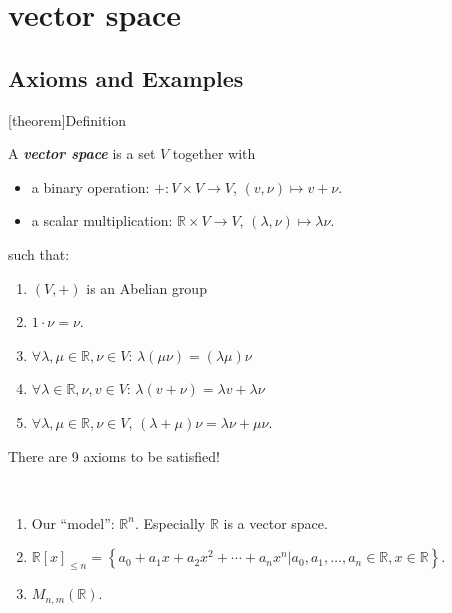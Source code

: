 \documentclass[12pt]{report}
\theoremstyle{definition}
\begin{document}
\section{vector space}

\subsection{Axioms and Examples}

[theorem]{Definition}
\begin{vector space}
    A \textbf{\emph{vector space}} is a set $V$ together with
                \begin{itemize}
                        \item a binary operation: $+:V\times V \rightarrow{} V$,
                            $(v, \nu) \mapsto v + \nu$.
                        \item a scalar multiplication: $\mathbb{R}\times V \rightarrow{} V$,
                            $(\lambda, \nu) \mapsto \lambda \nu$.
                \end{itemize}
              such that:
              \begin{enumerate}[label = (\arabic*)]
                  \item $(V,+)$ is an Abelian group
                  \item $1 \cdot \nu = \nu$.
                  \item $\forall \lambda, \mu \in \mathbb{R}, \nu \in V$:
                      $\lambda(\mu\nu) = (\lambda\mu)\nu$
                  \item $\forall \lambda \in \mathbb{R}, \nu,v \in V$:
                      $\lambda(v +\nu) = \lambda v + \lambda\nu$
                  \item $\forall \lambda, \mu \in \mathbb{R}, \nu \in V$,
                      $(\lambda + \mu)\nu = \lambda\nu + \mu\nu$.
              \end{enumerate}
              There are 9 axioms to be satisfied!
\end{vector space}

\begin{ex}
    \,

    \begin{enumerate}[label = (\arabic*)]
        \item Our ``model'': $\mathbb{R}^{n}$. Especially $\mathbb{R}$ is a vector space.

        \item 
            $\mathbb{R}{[x]}_{\le n} = \left\{a_0+ a_1x + a_2x^{2} + \cdots + a_n x^{n}
            |a_0, a_1,\ldots, a_n\in \mathbb{R}, x\in \mathbb{R}\right\} $.

        \item $M_{n,m}(\mathbb{R})$.
    \end{enumerate}
    
\end{ex}
\end{document}

